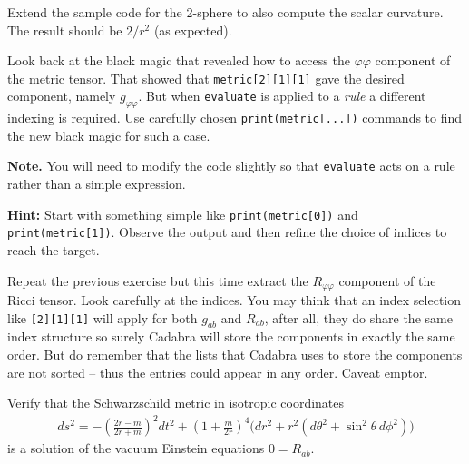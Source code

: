 \documentclass[a4paper,12pt]{article}
\numberwithin{equation}{section}%
\begin{document}
\begin{Exercises}
   \begin{Exercise}
      Extend the sample code for the 2-sphere to also compute the scalar curvature.
      The result should be $2/r^2$ (as expected).
   \end{Exercise}

   \begin{Exercise}
      Look back at the black magic that revealed how to access the $\varphi\varphi$ component
      of the metric tensor. That showed that \verb|metric[2][1][1]| gave the desired
      component, namely $g_{\varphi\varphi}$. But when \verb|evaluate| is applied to a
      \emph{rule} a different indexing is required. Use carefully chosen
      \verb|print(metric[...])| commands to find the new black magic for such a case.

      {\bf Note.} You will need to modify the code slightly so that \verb|evaluate| acts on
                  a rule rather than a simple expression.

      {\bf Hint:} Start with something simple like \verb|print(metric[0])| and
                  \verb|print(metric[1])|. Observe the output and then refine the choice of
                  indices to reach the target.
   \end{Exercise}

   \begin{Exercise}
      Repeat the previous exercise but this time extract the $R_{\varphi\varphi}$ component
      of the Ricci tensor. Look carefully at the indices. You may think that an index
      selection like \verb|[2][1][1]| will apply for both $g_{a b}$ and $R_{a b}$, after all,
      they do share the same index structure so surely Cadabra will store the components in
      exactly the same order. But do remember that the lists that Cadabra uses to store the
      components are not sorted -- thus the entries could appear in any order. Caveat emptor.
   \end{Exercise}

   \begin{Exercise}
      Verify that the Schwarzschild metric in isotropic coordinates
      \begin{align*}
         ds^2 = - \left(\frac{2r-m}{2r+m}\right)^2 dt^2
                + \left(1+\frac{m}{2r}\right)^4
                  \Big( dr^2 + r^2\left(d\theta^2 + \sin^2\theta\, d\phi^2\right)\Big)
      \end{align*}
      is a solution of the vacuum Einstein equations $0=R_{ab}$.
   \end{Exercise}


\end{Exercises}
\end{document}
